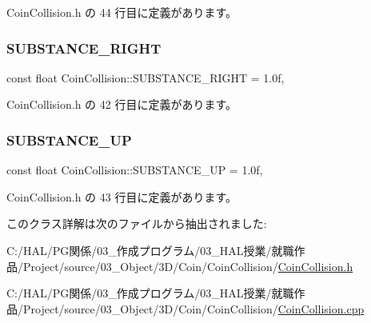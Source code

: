  Coin\+Collision.\+h の 44 行目に定義があります。

\mbox{\label{class_coin_collision_aa8f9e6be6e1b384fb5db936f2f3fe29d}} 
\subsubsection{\texorpdfstring{S\+U\+B\+S\+T\+A\+N\+C\+E\+\_\+\+R\+I\+G\+HT}{SUBSTANCE\_RIGHT}}
{\footnotesize\ttfamily const float Coin\+Collision\+::\+S\+U\+B\+S\+T\+A\+N\+C\+E\+\_\+\+R\+I\+G\+HT = 1.\+0f\hspace{0.3cm}{\ttfamily [static]}, {\ttfamily [private]}}



 Coin\+Collision.\+h の 42 行目に定義があります。

\mbox{\label{class_coin_collision_a5d8b3e5d27c1f87758fa721041c5a45a}} 
\subsubsection{\texorpdfstring{S\+U\+B\+S\+T\+A\+N\+C\+E\+\_\+\+UP}{SUBSTANCE\_UP}}
{\footnotesize\ttfamily const float Coin\+Collision\+::\+S\+U\+B\+S\+T\+A\+N\+C\+E\+\_\+\+UP = 1.\+0f\hspace{0.3cm}{\ttfamily [static]}, {\ttfamily [private]}}



 Coin\+Collision.\+h の 43 行目に定義があります。



このクラス詳解は次のファイルから抽出されました\+:\begin{DoxyCompactItemize}
\item 
C\+:/\+H\+A\+L/\+P\+G関係/03\+\_\+作成プログラム/03\+\_\+\+H\+A\+L授業/就職作品/\+Project/source/03\+\_\+\+Object/3\+D/\+Coin/\+Coin\+Collision/\mbox{\hyperlink{_coin_collision_8h}{Coin\+Collision.\+h}}\item 
C\+:/\+H\+A\+L/\+P\+G関係/03\+\_\+作成プログラム/03\+\_\+\+H\+A\+L授業/就職作品/\+Project/source/03\+\_\+\+Object/3\+D/\+Coin/\+Coin\+Collision/\mbox{\hyperlink{_coin_collision_8cpp}{Coin\+Collision.\+cpp}}\end{DoxyCompactItemize}
